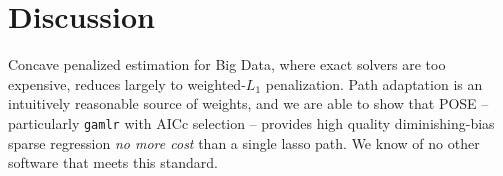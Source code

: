 \documentclass[12pt]{article}
\begin{document}
\section{Discussion}
\label{discussion}


Concave penalized estimation for Big Data, where exact solvers are too
 expensive, reduces largely to weighted-$L_1$ penalization.
Path adaptation is an intuitively reasonable source of weights, and we are able to show that POSE -- particularly {\tt gamlr} with AICc selection -- provides high quality diminishing-bias sparse regression
{\it no more cost} than a  single lasso path.  We know of no other software that meets this standard.





\end{document}
